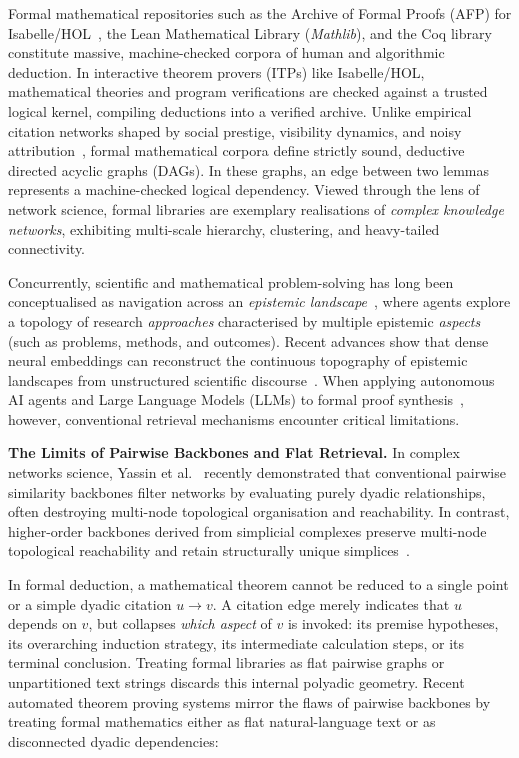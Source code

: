 \documentclass{svproc}
\begin{document}
Formal mathematical repositories such as the Archive of Formal Proofs (AFP) for Isabelle/HOL~\cite{afp_archive,wenzel_isabelle_2008}, the Lean Mathematical Library (\emph{Mathlib}), and the Coq library constitute massive, machine-checked corpora of human and algorithmic deduction. In interactive theorem provers (ITPs) like Isabelle/HOL, mathematical theories and program verifications are checked against a trusted logical kernel, compiling deductions into a verified archive. Unlike empirical citation networks shaped by social prestige, visibility dynamics, and noisy attribution~\cite{newman_structure_2003,fortunato_science_2018}, formal mathematical corpora define strictly sound, deductive directed acyclic graphs (DAGs). In these graphs, an edge between two lemmas represents a machine-checked logical dependency. Viewed through the lens of network science, formal libraries are exemplary realisations of \emph{complex knowledge networks}, exhibiting multi-scale hierarchy, clustering, and heavy-tailed connectivity.

Concurrently, scientific and mathematical problem-solving has long been conceptualised as navigation across an \emph{epistemic landscape}~\cite{weisberg_epistemic_2009}, where agents explore a topology of research \emph{approaches} characterised by multiple epistemic \emph{aspects} (such as problems, methods, and outcomes). Recent advances show that dense neural embeddings can reconstruct the continuous topography of epistemic landscapes from unstructured scientific discourse~\cite{correia_embedding-based_2026}. When applying autonomous AI agents and Large Language Models (LLMs) to formal proof synthesis~\cite{polu_generative_2020,first_bal_2023}, however, conventional retrieval mechanisms encounter critical limitations.

\medskip\noindent\textbf{The Limits of Pairwise Backbones and Flat Retrieval.} In complex networks science, Yassin et al.~\cite{yassin_high-order_2026} recently demonstrated that conventional pairwise similarity backbones filter networks by evaluating purely dyadic relationships, often destroying multi-node topological organisation and reachability. In contrast, higher-order backbones derived from simplicial complexes preserve multi-node topological reachability and retain structurally unique simplices~\cite{yassin_high-order_2026,battiston_networks_2020,bianconi_higher-order_2021}.

In formal deduction, a mathematical theorem cannot be reduced to a single point or a simple dyadic citation $u \to v$. A citation edge merely indicates that $u$ depends on $v$, but collapses \emph{which aspect} of $v$ is invoked: its premise hypotheses, its overarching induction strategy, its intermediate calculation steps, or its terminal conclusion. Treating formal libraries as flat pairwise graphs or unpartitioned text strings discards this internal polyadic geometry. Recent automated theorem proving systems mirror the flaws of pairwise backbones by treating formal mathematics either as flat natural-language text or as disconnected dyadic dependencies:
\end{document}
